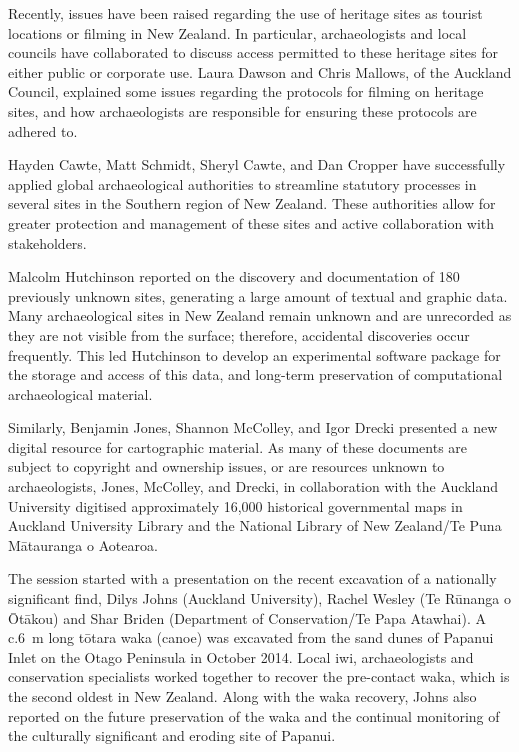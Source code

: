 Recently, issues have been raised regarding the use of heritage sites as tourist locations or filming in New Zealand. In particular, archaeologists and local councils have collaborated to discuss access permitted to these heritage sites for either public or corporate use. Laura Dawson and Chris Mallows, of the Auckland Council, explained some issues regarding the protocols for filming on heritage sites, and how archaeologists are responsible for ensuring these protocols are adhered to. 

Hayden Cawte, Matt Schmidt, Sheryl Cawte, and Dan Cropper have successfully applied global archaeological authorities to streamline statutory processes in several sites in the Southern region of New Zealand. These authorities allow for greater protection and management of these sites and active collaboration with stakeholders.  

Malcolm Hutchinson reported on the discovery and documentation of 180 previously unknown sites, generating a large amount of textual and graphic data. Many archaeological sites in New Zealand remain unknown and are unrecorded as they are not visible from the surface; therefore, accidental discoveries occur frequently. This led Hutchinson to develop an experimental software package for the storage and access of this data, and long-term preservation of computational archaeological material. 

Similarly, Benjamin Jones, Shannon McColley, and Igor Drecki presented a new digital resource for cartographic material. As many of these documents are subject to copyright and ownership issues, or are resources unknown to archaeologists, Jones, McColley, and Drecki, in collaboration with the Auckland University digitised approximately 16,000 historical governmental maps in Auckland University Library and the National Library of New Zealand/Te Puna Mātauranga o Aotearoa. 


The session started with a presentation on the recent excavation of a nationally significant find, Dilys Johns (Auckland University), Rachel Wesley (Te Rūnanga o Ōtākou) and Shar Briden (Department of Conservation/Te Papa Atawhai). A c.\SI{6}{\metre} long tōtara waka (canoe) was excavated from the sand dunes of Papanui Inlet on the Otago Peninsula in October 2014. Local iwi, archaeologists and conservation specialists worked together to recover the pre-contact waka, which is the second oldest in New Zealand. Along with the waka recovery, Johns also reported on the future preservation of the waka and the continual monitoring of the culturally significant and eroding site of Papanui.    
  

